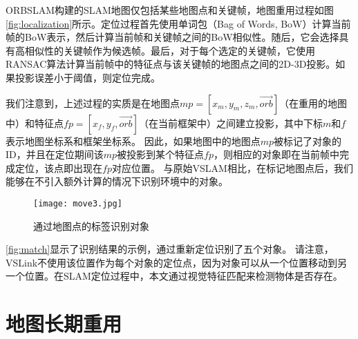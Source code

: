 ORBSLAM\cite{mur2017orb}构建的SLAM地图仅包括某些地图点和关键帧，地图重用过程如图\ref{fig:localization}所示。定位过程首先使用单词包（Bag of Words, BoW）\cite{galvez2012bags}计算当前帧的BoW表示，然后计算当前帧和关键帧之间的BoW相似性。随后，它会选择具有高相似性的关键帧作为候选帧。最后，对于每个选定的关键帧，它使用RANSAC\cite{derpanis2010overview}算法计算当前帧中的特征点与该关键帧的地图点之间的2D-3D投影。如果投影误差小于阈值，则定位完成。

我们注意到，上述过程的实质是在地图点$mp = [x_m,y_m,z_m,\vec{orb}]$（在重用的地图中）和特征点$fp = [x_f,y_f,\vec{orb}]$（在当前框架中）之间建立投影，其中下标$m$和$f$表示地图坐标系和框架坐标系。
因此，如果地图中的地图点$mp$被标记了对象的ID，并且在定位期间该$mp$被投影到某个特征点$fp$，则相应的对象即在当前帧中完成定位，该点即出现在$fp$对应位置。
与原始VSLAM相比，在标记地图点后，我们能够在不引入额外计算的情况下识别环境中的对象。


\begin{figure}[htbp]
	\centering
	\texttt{[image: move3.jpg]}
	\caption{通过地图点的标签识别对象}
	\label{fig:match}
\end{figure}

\autoref{fig:match}显示了识别结果的示例，通过重新定位识别了五个对象。
请注意，VSLink不使用该位置作为每个对象的定位点，因为对象可以从一个位置移动到另一个位置。在SLAM定位过程中，本文通过视觉特征匹配来检测物体是否存在。


\section{地图长期重用}

